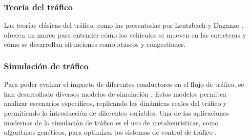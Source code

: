\subsubsection{Teoría del tráfico}
Las teorías clásicas del tráfico, como las presentadas por Leutzbach \cite{leutzbach1988} y Daganzo \cite{daganzo2002},
ofrecen un marco para entender cómo los vehículos se mueven en las carreteras y cómo se desarrollan situaciones como atascos y congestiones.

\subsubsection{Simulación de tráfico}
Para poder evaluar el impacto de diferentes conductores en el flujo de tráfico,
se han desarrollado diversos modelos de simulación \cite{fisher2011,shinar2017}.
Estos modelos permiten analizar escenarios específicos, replicando las dinámicas reales del tráfico y permitiendo la introducción de diferentes variables.
Una de las aplicaciones modernas de la simulación de tráfico es el uso de metaheurísticas, como algoritmos genéticos, para optimizar los sistemas de control de tráfico \cite{teo2010}.